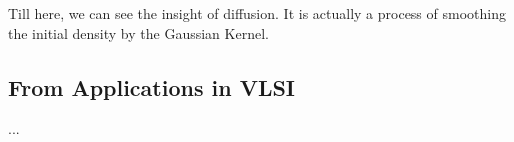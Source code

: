 \documentclass{article}
\begin{document}
Till here, we can see the insight of diffusion. It is actually a process of smoothing the initial density by the Gaussian Kernel.

\subsection{From Applications in VLSI}
...
\end{document}
